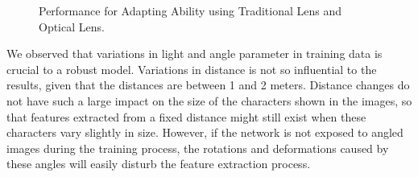 \begin{figure}[!t]
    \centering
    \hfill
    \caption[Optical Lens]{Performance for Adapting Ability using Traditional Lens and Optical Lens.}
    \label{fig:adapting}
\end{figure}

We observed that variations in light and angle parameter in training data is crucial to a robust model. Variations in distance is not so influential to the results, given that the distances are between 1 and 2 meters. Distance changes do not have such a large impact on the size of the characters shown in the images, so that features extracted from a fixed distance might still exist when these characters vary slightly in size. However, if the network is not exposed to angled images during the training process, the rotations and deformations caused by these angles will easily disturb the feature extraction process.

